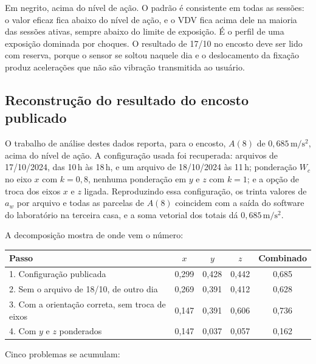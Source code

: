 \documentclass[11pt,a4paper]{article}
\newcommand{\unit}[2]{\ensuremath{#1\,\mathrm{#2}}}
\begin{document}
\noindent
Em negrito, acima do nível de ação. O padrão é consistente em todas as sessões:
o valor eficaz fica abaixo do nível de ação, e o VDV fica acima dele na maioria
das sessões ativas, sempre abaixo do limite de exposição. É o perfil de uma
exposição dominada por choques. O resultado de 17/10 no encosto deve ser lido
com reserva, porque o sensor se soltou naquele dia e o deslocamento da fixação
produz acelerações que não são vibração transmitida ao usuário.

\subsection{Reconstrução do resultado do encosto publicado}
\label{sec:encosto}

O trabalho de análise destes dados reporta, para o encosto, $A(8)$ de
\unit{0{,}685}{m/s^2}, acima do nível de ação. A configuração usada foi
recuperada: arquivos de 17/10/2024, das 10\,h às 18\,h, e um arquivo de
18/10/2024 às 11\,h; ponderação $W_c$ no eixo $x$ com $k = 0{,}8$, nenhuma
ponderação em $y$ e $z$ com $k = 1$; e a opção de troca dos eixos $x$ e $z$
ligada. Reproduzindo essa configuração, os trinta valores de $a_w$ por arquivo
e todas as parcelas de $A(8)$ coincidem com a saída do software do laboratório
na terceira casa, e a soma vetorial dos totais dá \unit{0{,}685}{m/s^2}.

A decomposição mostra de onde vem o número:

\begin{center}
\small
\begin{tabular}{lcccc}
\toprule
Passo & $x$ & $y$ & $z$ & Combinado \\
\midrule
1. Configuração publicada                        & 0,299 & 0,428 & 0,442 & 0,685 \\
2. Sem o arquivo de 18/10, de outro dia           & 0,269 & 0,391 & 0,412 & 0,628 \\
3. Com a orientação correta, sem troca de eixos   & 0,147 & 0,391 & 0,606 & 0,736 \\
4. Com $y$ e $z$ ponderados                       & 0,147 & 0,037 & 0,057 & 0,162 \\
\bottomrule
\end{tabular}
\end{center}

Cinco problemas se acumulam:
\end{document}
